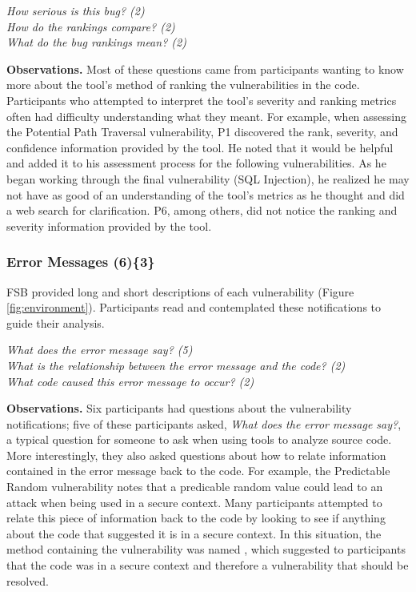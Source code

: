 \documentclass{acm_proc_article-sp}
\begin{document}
\noindent\emph{How serious is this bug? (2)} \\
\emph{How do the rankings compare? (2)} \\
\emph{What do the bug rankings mean? (2)}

\noindent\textbf{Observations.}
Most of these questions came from participants wanting to know more about the tool's method of ranking the vulnerabilities in the code.
Participants who attempted to interpret the tool's severity and ranking metrics often had difficulty understanding what they meant. 
For example, when assessing the Potential Path Traversal vulnerability, P1 discovered the rank, severity, and confidence information provided by the tool. 
He noted that it would be helpful and added it to his assessment process for the following vulnerabilities.
As he began working through the final vulnerability (SQL Injection), he realized he may not have as good of an understanding of the tool's metrics as he thought and did a web search for clarification. 
P6, among others, did not notice the ranking and severity information provided by the tool. 



\subsubsection{\textbf{Error Messages (6)\{3\}}}\label{em}

FSB provided long and short descriptions of each vulnerability (Figure \ref{fig:environment}). 
Participants read and contemplated these notifications to guide their analysis.


\noindent\emph{What does the error message say? (5)} \\
\emph{What is the relationship between the error message and the code? (2)} \\
\emph{What code caused this error message to occur? (2)} 

\noindent\textbf{Observations.}
Six participants had questions about the vulnerability notifications; five of these participants asked, \textit{What does the error message say?}, a typical question for someone to ask when using tools to analyze source code.
More interestingly, they also asked questions about how to relate information contained in the error message back to the code. 
For example, the Predictable Random vulnerability notes that a predicable random value could lead to an attack when being used in a secure context. 
Many participants attempted to relate this piece of information back to the code by looking to see if anything about the code that suggested it is in a secure context. 
In this situation, the method containing the vulnerability was named , which suggested to participants that the code was in a secure context and therefore a vulnerability that should be resolved.
\end{document}
